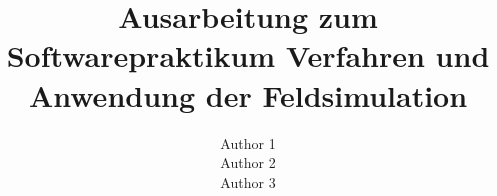 \documentclass[scrreprt,colorback,accentcolor=tud9b, 11pt]{tudreport}
\begin{document}
    \title{Ausarbeitung zum Softwarepraktikum Verfahren und Anwendung der
    Feldsimulation}
    \subtitle{Author 1 \\ Author 2 \\ Author 3}
    \maketitle

    \tableofcontents

%    
%    
%    
%    
%    
%    
%    
%    

\listoffigures
\end{document}

